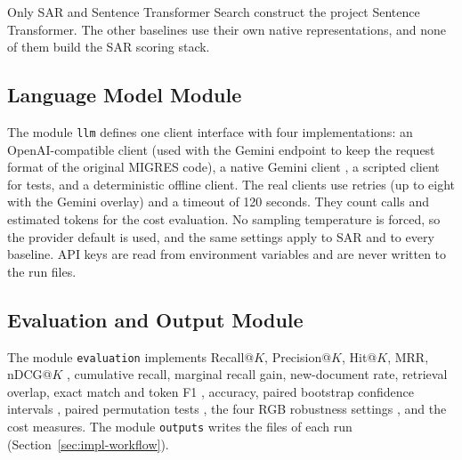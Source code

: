 \documentclass[12pt,a4paper]{report}
\begin{document}
Only SAR and Sentence Transformer Search construct the project Sentence Transformer. The other baselines use their own native representations, and none of them build the SAR scoring stack.

\subsection{Language Model Module}

The module \texttt{llm} defines one client interface with four implementations: an OpenAI-compatible client (used with the Gemini endpoint to keep the request format of the original MIGRES code), a native Gemini client \cite{gemini2023}, a scripted client for tests, and a deterministic offline client. The real clients use retries (up to eight with the Gemini overlay) and a timeout of 120 seconds. They count calls and estimated tokens for the cost evaluation. No sampling temperature is forced, so the provider default is used, and the same settings apply to SAR and to every baseline. API keys are read from environment variables and are never written to the run files.

\subsection{Evaluation and Output Module}

The module \texttt{evaluation} implements Recall@$K$, Precision@$K$, Hit@$K$, MRR, nDCG@$K$ \cite{jarvelin2002cumulated}, cumulative recall, marginal recall gain, new-document rate, retrieval overlap, exact match and token F1 \cite{rajpurkar2016squad}, accuracy, paired bootstrap confidence intervals \cite{efron1993bootstrap}, paired permutation tests \cite{smucker2007comparison}, the four RGB robustness settings \cite{chen2024rgb}, and the cost measures. The module \texttt{outputs} writes the files of each run (Section~\ref{sec:impl-workflow}).
\end{document}
